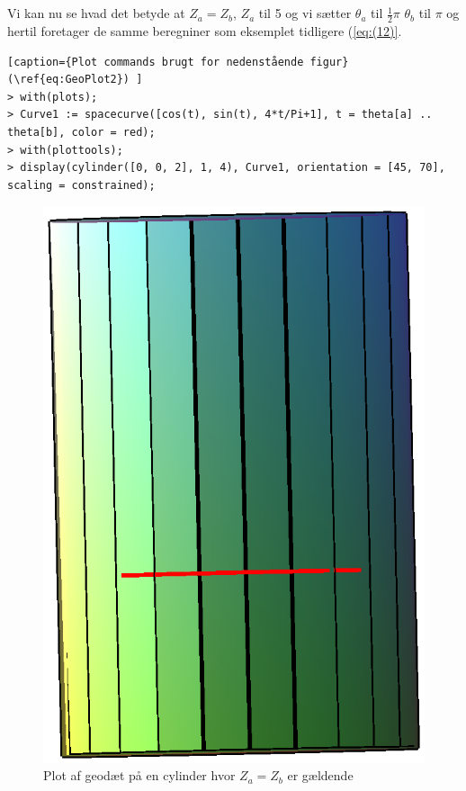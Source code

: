 \\
\\
Vi kan nu se hvad det betyde at $Z_a=Z_b$, $Z_a$ til 5 og vi sætter $\theta_a$ til $\frac{1}{2}\pi$ $\theta_b$ til $\pi$ og hertil foretager de samme beregniner som eksemplet tidligere (\ref{eq:(12)}.
\begin{lstlisting}[caption={Plot commands brugt for nedenstående figur}(\ref{eq:GeoPlot2}) ]
> with(plots);
> Curve1 := spacecurve([cos(t), sin(t), 4*t/Pi+1], t = theta[a] .. theta[b], color = red);
> with(plottools);
> display(cylinder([0, 0, 2], 1, 4), Curve1, orientation = [45, 70], scaling = constrained);

\end{lstlisting}
\begin{figure}[ht]\label{eq:GeoPlot2}
\center
\includegraphics[scale=0.4]{pictures/Opg8_Fig2.eps}
\caption{Plot af geodæt på en cylinder hvor $Z_a=Z_b$ er gældende}
\end{figure}
